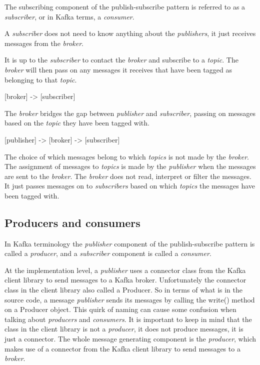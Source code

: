 \documentclass{article}
\newcommand{\kafka} {Kafka\xspace}
\newcommand{\kftopic} {\textit{topic}\xspace}
\newcommand{\kftopics} {\textit{topics}\xspace}
\newcommand{\kfbroker} {\textit{broker}\xspace}
\newcommand{\kfconsumer} {\textit{consumer}\xspace}
\newcommand{\kfconsumers} {\textit{consumers}\xspace}
\newcommand{\kfproducer} {\textit{producer}\xspace}
\newcommand{\kfproducers} {\textit{producers}\xspace}
\newcommand{\kfpublisher} {\textit{publisher}\xspace}
\newcommand{\kfpublishers} {\textit{publishers}\xspace}
\newcommand{\kfsubscriber} {\textit{subscriber}\xspace}
\newcommand{\kfsubscribers} {\textit{subscribers}\xspace}
\newcommand{\javaname}[1] {{\ttfamily\color{codeblue} #1}}
\begin{document}
The subscribing component of the publish-subscribe pattern is referred to as a \kfsubscriber, or in \kafka terms, a \kfconsumer.

A \kfsubscriber does not need to know anything about the \kfpublishers, it just receives messages from the \kfbroker. 

It is up to the \kfsubscriber to contact the \kfbroker and subscribe to a \kftopic. The \kfbroker will then pass on any messages it receives that have been tagged as belonging to that \kftopic.

   [broker] -> [subscriber]

The \kfbroker bridges the gap between \kfpublisher and \kfsubscriber, passing on messages based on the \kftopic they have been tagged with.

    [publisher] -> [broker] -> [subscriber]

The choice of which messages belong to which \kftopics is not made by the \kfbroker. The assignment of messages to \kftopics is made by the \kfpublisher  when the messages  are sent to the \kfbroker. The \kafa \kfbroker does not read, interpret or filter the messages. It just passes messages on to \kfsubscribers based on which \kftopics the messages have been tagged with. 

\subsection{Producers and consumers}
\label{kafka-producer-consumer}

In \kafka terminology the \kfpublisher component of the publish-subscribe pattern is called a \kfproducer, and a \kfsubscriber component is called a \kfconsumer.

At the implementation level, a \kfpublisher uses a connector class from the \kafka client library to send messages to a \kafka broker.
Unfortunately the connector class in the client library also called a \javaname{Producer}. So in terms of what is in the source code, a message \kfpublisher sends its messages by calling the \javaname{write()} method on a \javaname{Producer} object.
This quirk of naming can cause some confusion when talking about \kfproducers and \kfconsumers.
It is important to keep in mind that the class in the client library is not a \kfproducer, it does not produce messages, it is just a connector. The whole message generating component is the \kfproducer, which makes use of a connector from the \kafka client library to send messages to a \kfbroker.
\end{document}
